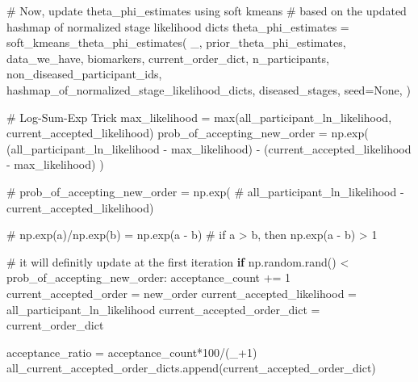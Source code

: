\documentclass[
  letterpaper,
  DIV=11,
  numbers=noendperiod]{scrreprt}
\newenvironment{Shaded}{\begin{snugshade}}{\end{snugshade}}
\newcommand{\BuiltInTok}[1]{\textcolor[rgb]{0.00,0.23,0.31}{#1}}
\newcommand{\CommentTok}[1]{\textcolor[rgb]{0.37,0.37,0.37}{#1}}
\newcommand{\ControlFlowTok}[1]{\textcolor[rgb]{0.00,0.23,0.31}{\textbf{#1}}}
\newcommand{\DecValTok}[1]{\textcolor[rgb]{0.68,0.00,0.00}{#1}}
\newcommand{\NormalTok}[1]{\textcolor[rgb]{0.00,0.23,0.31}{#1}}
\newcommand{\OperatorTok}[1]{\textcolor[rgb]{0.37,0.37,0.37}{#1}}
\newcommand{\VariableTok}[1]{\textcolor[rgb]{0.07,0.07,0.07}{#1}}
\begin{document}
\begin{Shaded}
\begin{Highlighting}[]
        \CommentTok{\# Now, update theta\_phi\_estimates using soft kmeans}
        \CommentTok{\# based on the updated hashmap of normalized stage likelihood dicts}
\NormalTok{        theta\_phi\_estimates }\OperatorTok{=}\NormalTok{ soft\_kmeans\_theta\_phi\_estimates(}
\NormalTok{            \_,}
\NormalTok{            prior\_theta\_phi\_estimates,}
\NormalTok{            data\_we\_have,}
\NormalTok{            biomarkers,}
\NormalTok{            current\_order\_dict,}
\NormalTok{            n\_participants,}
\NormalTok{            non\_diseased\_participant\_ids,}
\NormalTok{            hashmap\_of\_normalized\_stage\_likelihood\_dicts,}
\NormalTok{            diseased\_stages,}
\NormalTok{            seed}\OperatorTok{=}\VariableTok{None}\NormalTok{,}
\NormalTok{        )}

        \CommentTok{\# Log{-}Sum{-}Exp Trick}
\NormalTok{        max\_likelihood }\OperatorTok{=} \BuiltInTok{max}\NormalTok{(all\_participant\_ln\_likelihood,}
\NormalTok{                             current\_accepted\_likelihood)}
\NormalTok{        prob\_of\_accepting\_new\_order }\OperatorTok{=}\NormalTok{ np.exp(}
\NormalTok{            (all\_participant\_ln\_likelihood }\OperatorTok{{-}}\NormalTok{ max\_likelihood) }\OperatorTok{{-}}
\NormalTok{            (current\_accepted\_likelihood }\OperatorTok{{-}}\NormalTok{ max\_likelihood)}
\NormalTok{        )}

        \CommentTok{\# prob\_of\_accepting\_new\_order = np.exp(}
        \CommentTok{\#     all\_participant\_ln\_likelihood {-} current\_accepted\_likelihood)}

        \CommentTok{\# np.exp(a)/np.exp(b) = np.exp(a {-} b)}
        \CommentTok{\# if a \textgreater{} b, then np.exp(a {-} b) \textgreater{} 1}

        \CommentTok{\# it will definitly update at the first iteration}
        \ControlFlowTok{if}\NormalTok{ np.random.rand() }\OperatorTok{\textless{}}\NormalTok{ prob\_of\_accepting\_new\_order:}
\NormalTok{            acceptance\_count }\OperatorTok{+=} \DecValTok{1}
\NormalTok{            current\_accepted\_order }\OperatorTok{=}\NormalTok{ new\_order}
\NormalTok{            current\_accepted\_likelihood }\OperatorTok{=}\NormalTok{ all\_participant\_ln\_likelihood}
\NormalTok{            current\_accepted\_order\_dict }\OperatorTok{=}\NormalTok{ current\_order\_dict}

\NormalTok{        acceptance\_ratio }\OperatorTok{=}\NormalTok{ acceptance\_count}\OperatorTok{*}\DecValTok{100}\OperatorTok{/}\NormalTok{(\_}\OperatorTok{+}\DecValTok{1}\NormalTok{)}
\NormalTok{        all\_current\_accepted\_order\_dicts.append(current\_accepted\_order\_dict)}


\end{Highlighting}
\end{Shaded}
\end{document}
